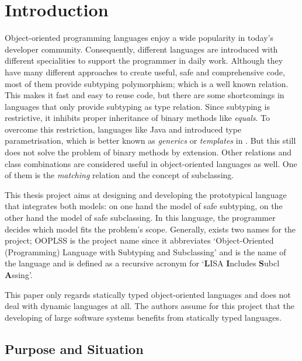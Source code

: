 \chapter{Introduction}
Object-oriented programming languages enjoy a wide popularity in
today's developer community. Consequently, different languages are
introduced with different specialities to support the programmer in
daily work. Although they have many different approaches to create
useful, safe and comprehensive code, most of them provide subtyping
polymorphism; which is a well known relation. This makes it fast and
easy to reuse code, but there are some shortcomings in languages that
only provide subtyping as type relation. Since subtyping is restrictive,
it inhibits proper inheritance of binary methods like \emph{equals}. To
overcome this restriction, languages like Java and \cs introduced
type parametrisation, which is better known as \emph{generics} or
\emph{templates} in \cpp. But this still does not solve the problem of
binary methods by extension. Other relations and class combinations are
considered useful in object-oriented languages as well. One of them is
the \emph{matching} relation and the concept of subclassing.

This thesis project aims at designing and developing the
prototypical language \ooplss that integrates both models: on one
hand the model of safe subtyping, on the other hand the model of
safe subclassing. In this language, the programmer decides which
model fits the problem's scope. Generally, exists two names for the
project; OOPLSS is the project name since it
abbreviates `Object-Oriented (Programming) Language with Subtyping and
Subclassing' and \ooplss is the name of the language and is defined
as a recursive acronym for `{\bf L}ISA {\bf I}ncludes {\bf S}ubcl{\bf
A}ssing'.

This paper only regards statically typed object-oriented languages and does
not deal with dynamic languages at all. The authors assume for this project
that the developing of large software systems benefits from statically
typed languages.

\section{Purpose and Situation}
